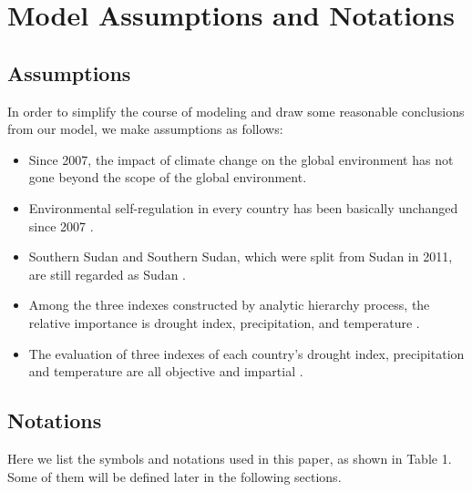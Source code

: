 \documentclass{mcmthesis}
\begin{document}
\section{Model Assumptions and Notations}%
\subsection{Assumptions}
In order to simplify the course of modeling and draw some reasonable conclusions
from our model, we make assumptions as follows:

\begin{itemize}
\item 	Since 2007, the impact of climate change on the global environment has not gone beyond the scope of the global environment.
\item  Environmental self-regulation in every country has been basically unchanged since 2007 .
\item Southern Sudan and Southern Sudan, which were split from  Sudan in 2011, are still regarded as Sudan .
\item 	Among the three indexes constructed by analytic hierarchy process, the relative importance is drought index, precipitation, and temperature .
\item 	The evaluation of three indexes of each country's drought index, precipitation and temperature are all objective and impartial .

\end{itemize}



\subsection{Notations}
\par Here we list the symbols and notations used in this paper, as shown in Table 1. Some
of them will be defined later in the following sections.
\end{document}
